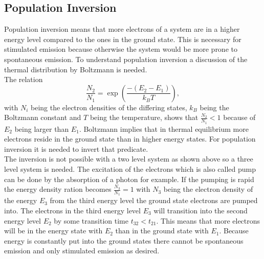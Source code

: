 \subsection{Population Inversion}
Population inversion means that more electrons of a system are in a higher energy level compared to the ones in the ground state. This is necessary for stimulated emission because otherwise the system would be more prone to spontaneous emission. To understand population inversion a discussion of the thermal distribution by Boltzmann is needed. \\
The relation 
\begin{equation*}
    \frac{N_2}{N_1}=\exp \left(\frac{-(E_2 - E_1)}{k_B T}\right),
\end{equation*}
with $N_i$ being the electron densities of the differing states, $k_B$ being the Boltzmann constant and $T$ being the temperature, shows that $\frac{N_2}{N_1} < 1$ because of $E_2$ being larger than $E_1$. Boltzmann implies that in thermal equilibrium more electrons reside in the ground state than in higher energy states. For population inversion it is needed to invert that predicate. \\
The inversion is not possible with a two level system as shown above so a three level system is needed. The excitation of the electrons which is also called pump can be done by the absorption of a photon for example. If the pumping is rapid the energy density ration becomes $\frac{N_3}{N_1}=1$ with $N_3$ being the electron density of the energy $E_3$ from the third energy level the ground state electrons are pumped into. The electrons in the third energy level $E_3$ will transition into the second energy level $E_2$ by some transition time $t_{32} < t_{21}$. This means that more electrons will be in the energy state with $E_2$ than in the ground state with $E_1$. Because energy is constantly put into the ground states there cannot be spontaneous emission and only stimulated emission as desired.
